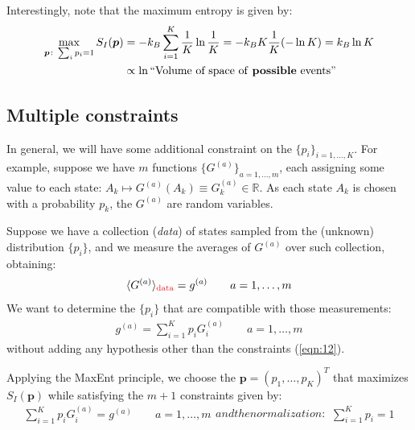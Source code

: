 \documentclass[../../main.tex]{subfiles}
\begin{document}
\medskip

Interestingly, note that the maximum entropy is given by:
\begin{align*}
    \max_{\bm{p} \colon \sum_i p_i = 1} S_I(\bm{p}) &= -k_B \sum_{i=1}^K \frac{1}{K} \ln \frac{1}{K} = -k_B K \frac{1}{K} (-\ln K) = k_B \ln K \\
    &\propto \ln \text{``Volume of space of \textbf{possible} events''}
\end{align*}

\subsection{Multiple constraints}
In general, we will have some additional constraint on the $\{p_i\}_{i=1,\dots,K}$. For example, suppose we have $m$ functions $\{G^{(a)}\}_{a=1,\dots,m}$, each assigning some value to each state: $A_k \mapsto G^{(a)}(A_k) \equiv G_k^{(a)} \in \mathbb{R}$. As each state $A_k$ is chosen with a probability $p_k$, the $G^{(a)}$ are random variables.

\medskip

Suppose we have a collection (\textit{data}) of states sampled from the (unknown) distribution $\{p_i\}$, and we measure the averages of $G^{(a)}$ over such collection, obtaining:
\begin{align}\label{eqn:11}
    \langle G^{(a)} \rangle_{\textcolor{Red}{\rm{data}}} = g^{(a)} \qquad a=1,\dots,m
\end{align}
We want to determine the $\{p_i\}$ that are compatible with those measurements:
\begin{align}\label{eqn:12}
    g^{(a)} = \sum_{i=1}^K p_i G_i^{(a)} \qquad a=1,\dots,m
\end{align}
without adding any  hypothesis other than the constraints (\ref{eqn:12}).

\medskip

Applying the MaxEnt principle, we choose the $\bm{p} = (p_1, \dots, p_K)^T$ that maximizes $S_I(\bm{p})$ while satisfying the $m+1$ constraints given by:
\begin{subequations}
\begin{align}\label{eqn:13a}
    \sum_{i=1}^K p_i G_i^{(a)} = g^{(a)} \qquad a=1,\dots,m
\end{align} 
and the normalization:
\begin{align}
    \sum_{i=1}^K p_i = 1
    \label{eqn:13b}
\end{align}
\end{subequations}
\end{document}
